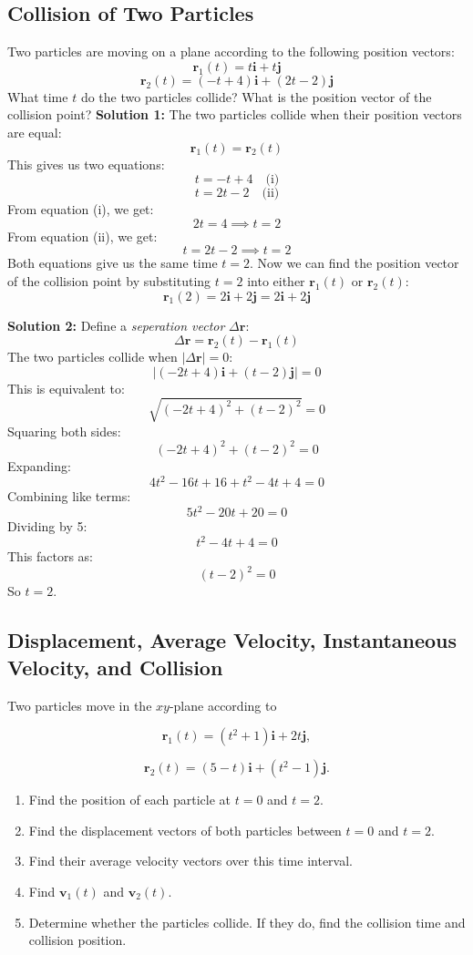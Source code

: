 \documentclass[12pt]{article}
\theoremstyle{remark}
\begin{document}
\subsection{Collision of Two Particles}
Two particles are moving on a plane according to the following position vectors:
\[
\mathbf{r}_1(t) = t\mathbf{i} + t\mathbf{j}
\]
\[
\mathbf{r}_2(t) = (-t+4)\mathbf{i} + (2t-2)\mathbf{j}
\]
What time $t$ do the two particles collide? What is the position vector of the collision point?
\textbf{Solution 1:} The two particles collide when their position vectors are equal:
\[
\mathbf{r}_1(t) = \mathbf{r}_2(t)
\]
This gives us two equations:
\[
t = -t + 4 \quad \text{(i)}
\]
\[
t = 2t - 2 \quad \text{(ii)}
\]
From equation (i), we get:
\[
2t = 4 \implies t = 2
\]
From equation (ii), we get:
\[
t = 2t - 2 \implies t = 2
\]
Both equations give us the same time $t = 2$. Now we can find the position vector of the collision point by substituting $t = 2$ into either $\mathbf{r}_1(t)$ or $\mathbf{r}_2(t)$:
\[
\mathbf{r}_1(2) = 2\mathbf{i} + 2\mathbf{j} = 2\mathbf{i} + 2\mathbf{j} 
\]

\textbf{Solution 2:} Define a \emph{seperation vector} $\Delta\mathbf{r}$:
\[
\Delta\mathbf{r} = \mathbf{r}_2(t) - \mathbf{r}_1(t)
\]
The two particles collide when $|\Delta\mathbf{r}| = 0$:
\[
|(-2t+4)\mathbf{i} + (t-2)\mathbf{j}| = 0
\]
This is equivalent to:
\[
\sqrt{(-2t+4)^2 + (t-2)^2} = 0
\]
Squaring both sides:
\[
(-2t+4)^2 + (t-2)^2 = 0
\]
Expanding:
\[
4t^2 - 16t + 16 + t^2 - 4t + 4 = 0
\]
Combining like terms:
\[
5t^2 - 20t + 20 = 0
\]
Dividing by 5:
\[
t^2 - 4t + 4 = 0
\]
This factors as:
\[
(t-2)^2 = 0
\]
So $t = 2$.

\subsection{Displacement, Average Velocity, Instantaneous Velocity, and Collision}

Two particles move in the \(xy\)-plane according to

\[
\mathbf{r}_1(t)=(t^2+1)\mathbf{i}+2t\mathbf{j},
\]

\[
\mathbf{r}_2(t)=(5-t)\mathbf{i}+(t^2-1)\mathbf{j}.
\]

\begin{enumerate}
    \item Find the position of each particle at \(t=0\) and \(t=2\).
    \item Find the displacement vectors of both particles between \(t=0\) and \(t=2\).
    \item Find their average velocity vectors over this time interval.
    \item Find \(\mathbf{v}_1(t)\) and \(\mathbf{v}_2(t)\).
    \item Determine whether the particles collide. If they do, find the collision time and collision position.
\end{enumerate}
\end{document}

